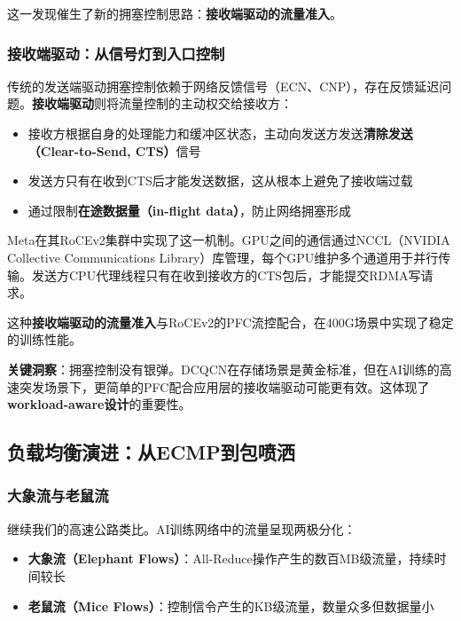 这一发现催生了新的拥塞控制思路：\textbf{接收端驱动的流量准入}。

\subsubsection{接收端驱动：从信号灯到入口控制}

传统的发送端驱动拥塞控制依赖于网络反馈信号（ECN、CNP），存在反馈延迟问题。\textbf{接收端驱动}则将流量控制的主动权交给接收方：

\begin{itemize}
    \item 接收方根据自身的处理能力和缓冲区状态，主动向发送方发送\textbf{清除发送（Clear-to-Send, CTS）}信号
    \item 发送方只有在收到CTS后才能发送数据，这从根本上避免了接收端过载
    \item 通过限制\textbf{在途数据量（in-flight data）}，防止网络拥塞形成
\end{itemize}

Meta在其RoCEv2集群中实现了这一机制。GPU之间的通信通过NCCL（NVIDIA Collective Communications Library）库管理，每个GPU维护多个通道用于并行传输。发送方CPU代理线程只有在收到接收方的CTS包后，才能提交RDMA写请求。

这种\textbf{接收端驱动的流量准入}与RoCEv2的PFC流控配合，在400G场景中实现了稳定的训练性能。

\textbf{关键洞察}：拥塞控制没有银弹。DCQCN在存储场景是黄金标准，但在AI训练的高速突发场景下，更简单的PFC配合应用层的接收端驱动可能更有效。这体现了\textbf{ workload-aware设计}的重要性。

\subsection{负载均衡演进：从ECMP到包喷洒}

\subsubsection{大象流与老鼠流}

继续我们的高速公路类比。AI训练网络中的流量呈现两极分化：

\begin{itemize}
    \item \textbf{大象流（Elephant Flows）}：All-Reduce操作产生的数百MB级流量，持续时间较长
    \item \textbf{老鼠流（Mice Flows）}：控制信令产生的KB级流量，数量众多但数据量小
\end{itemize}

